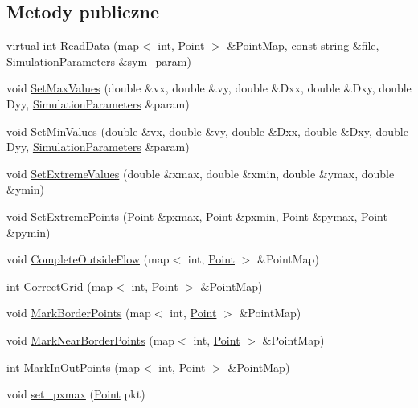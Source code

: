 \subsection*{Metody publiczne}
\begin{DoxyCompactItemize}
\item 
virtual int \hyperlink{class_grid_ac0cf78c28206fd44fba21c5a91d0a0e0}{Read\+Data} (map$<$ int, \hyperlink{class_point}{Point} $>$ \&Point\+Map, const string \&file, \hyperlink{class_simulation_parameters}{Simulation\+Parameters} \&sym\+\_\+param)
\item 
void \hyperlink{class_grid_affe0d058372cb86ef7816d536793341b}{Set\+Max\+Values} (double \&vx, double \&vy, double \&Dxx, double \&Dxy, double Dyy, \hyperlink{class_simulation_parameters}{Simulation\+Parameters} \&param)
\item 
void \hyperlink{class_grid_a25ecf93fd041648dcde213623589fa27}{Set\+Min\+Values} (double \&vx, double \&vy, double \&Dxx, double \&Dxy, double Dyy, \hyperlink{class_simulation_parameters}{Simulation\+Parameters} \&param)
\item 
void \hyperlink{class_grid_a4fc635f29b3dfa2075dc7e3cc6861762}{Set\+Extreme\+Values} (double \&xmax, double \&xmin, double \&ymax, double \&ymin)
\item 
void \hyperlink{class_grid_a03696ec5383f1a0222b447a0ff15d47c}{Set\+Extreme\+Points} (\hyperlink{class_point}{Point} \&pxmax, \hyperlink{class_point}{Point} \&pxmin, \hyperlink{class_point}{Point} \&pymax, \hyperlink{class_point}{Point} \&pymin)
\item 
void \hyperlink{class_grid_a3070db37370246f2028310f412d3d8c3}{Complete\+Outside\+Flow} (map$<$ int, \hyperlink{class_point}{Point} $>$ \&Point\+Map)
\item 
int \hyperlink{class_grid_ac438ff968a29cfaaebb410f2a08a48f4}{Correct\+Grid} (map$<$ int, \hyperlink{class_point}{Point} $>$ \&Point\+Map)
\item 
void \hyperlink{class_grid_a1e040eda61d389f8e0d141933ed6fb48}{Mark\+Border\+Points} (map$<$ int, \hyperlink{class_point}{Point} $>$ \&Point\+Map)
\item 
void \hyperlink{class_grid_a6270d5bfcdefee9477865a3a60baae73}{Mark\+Near\+Border\+Points} (map$<$ int, \hyperlink{class_point}{Point} $>$ \&Point\+Map)
\item 
int \hyperlink{class_grid_a0cc5771c532b0a92abb64d7f2df8eb1f}{Mark\+In\+Out\+Points} (map$<$ int, \hyperlink{class_point}{Point} $>$ \&Point\+Map)
\item 
void \hyperlink{class_grid_acdec1d78fe3ead312d1098837325d113}{set\+\_\+pxmax} (\hyperlink{class_point}{Point} pkt)

\end{DoxyCompactItemize}
